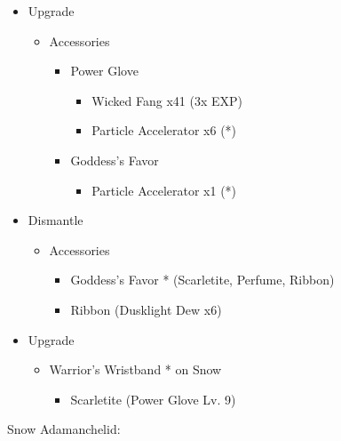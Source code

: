 \begin{multicols}{2}
\begin{upgrade}
\begin{itemize}
    \item Upgrade
    \begin{itemize}
        \item Accessories
        \begin{itemize}
            \item Power Glove
            \begin{itemize}
                \item Wicked Fang x41 (3x EXP)
                \item Particle Accelerator x6 (*)
            \end{itemize}
            \item Goddess's Favor
            \begin{itemize}
                \item Particle Accelerator x1 (*)
            \end{itemize}
        \end{itemize}
    \end{itemize}
    \item Dismantle
    \begin{itemize}
        \item Accessories
        \begin{itemize}
            \item Goddess's Favor * (Scarletite, Perfume, Ribbon)
            \item Ribbon (Dusklight Dew x6)
        \end{itemize}
    \end{itemize}
    \item Upgrade
    \begin{itemize}
        \item Warrior's Wristband * on Snow
        \begin{itemize}
            \item Scarletite (Power Glove Lv. 9)
        \end{itemize}
    \end{itemize}
\end{itemize}
\end{upgrade}
\end{multicols}
\newpage
\begin{center}
Snow Adamanchelid:
\end{center}
